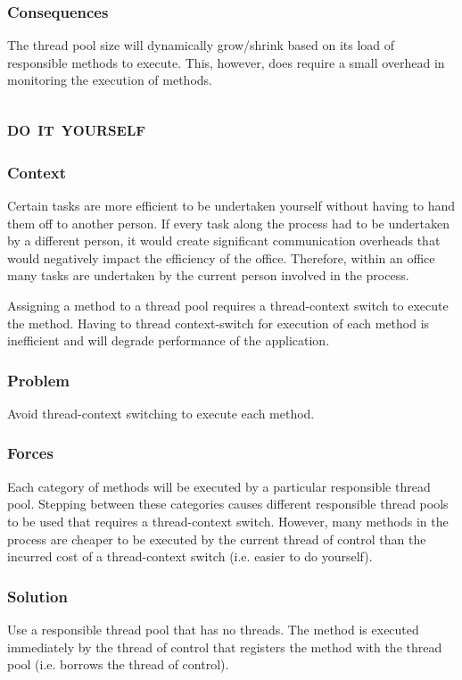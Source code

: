 \documentclass[prodmode]{style/acmlarge}
\begin{document}
\subsubsection*{Consequences} The thread pool size will dynamically grow/shrink
based on its load of responsible methods to execute.  This, however, does
require a small overhead in monitoring the execution of methods.



\subsection{\textsc{\textbf{do it yourself}}}

\subsubsection*{Context} Certain tasks are more efficient to be undertaken
yourself without having to hand them off to another person.  If every task along
the process had to be undertaken by a different person, it would create
significant communication overheads that would negatively impact the efficiency
of the office.  Therefore, within an office many tasks are undertaken by the
current person involved in the process.

Assigning a method to a thread pool requires a thread-context switch to execute
the method.  Having to thread context-switch for execution of each method is
inefficient and will degrade performance of the application.

\subsubsection*{Problem} Avoid thread-context switching to execute each method.

\subsubsection*{Forces} Each category of methods will be executed by a
particular responsible thread pool.  Stepping between these categories causes
different responsible thread pools to be used that requires a thread-context
switch.  However, many methods in the process are cheaper to be executed by the
current thread of control than the incurred cost of a thread-context switch
(i.e. easier to do yourself).

\subsubsection*{Solution} Use a responsible thread pool that has no threads.
The method is executed immediately by the thread of control that registers the
method with the thread pool (i.e. borrows the thread of control).
\end{document}
